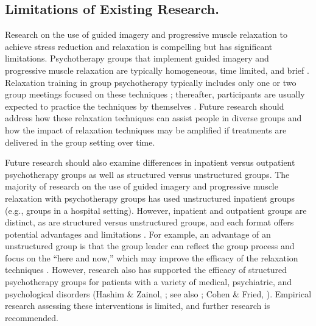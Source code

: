 \subsection*{Limitations of Existing Research.}

Research on the use of guided imagery and progressive muscle relaxation to achieve stress reduction and relaxation is compelling but has significant limitations. Psychotherapy groups that implement guided imagery and progressive muscle relaxation are typically homogeneous, time limited, and brief \citep{yalom2005theory}. Relaxation training in group psychotherapy typically includes only one or two group meetings focused on these techniques \citep{yalom2005theory}; thereafter, participants are usually expected to practice the techniques by themselves \citep[see][]{menzies2012imagery}. Future research should address how these relaxation techniques can assist people in diverse groups and how the impact of relaxation techniques may be amplified if treatments are delivered in the group setting over time.

Future research should also examine differences in inpatient versus outpatient psychotherapy groups as well as structured versus unstructured groups. The majority of research on the use of guided imagery and progressive muscle relaxation with psychotherapy groups has used unstructured inpatient groups (e.g., groups in a hospital setting). However, inpatient and outpatient groups are distinct, as are structured versus unstructured groups, and each format offers potential advantages and limitations \citep{yalom2005theory}. For example, an advantage of an unstructured group is that the group leader can reflect the group process and focus on the “here and now,” which may improve the efficacy of the relaxation techniques \citep{yalom2005theory}. However, research also has supported the efficacy of structured psychotherapy groups for patients with a variety of medical, psychiatric, and psychological disorders (Hashim \& Zainol, \citeyear{hashim2015distress}; see also \cite{baider1994progressive}; Cohen \& Fried, \citeyear{cohen2007comparing}). Empirical research assessing these interventions is limited, and further research is recommended.
